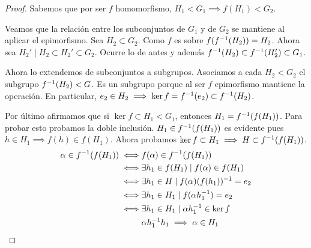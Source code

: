 \begin{proof}
	Sabemos que por ser $f$ homomorfismo, $H_1 < G_1 \implies f(H_1) < G_2$.
	
	Veamos que la relación entre los subconjuntos de $G_1$ y de $G_2$ se mantiene al aplicar el epimorfismo. Sea $H_2 \subset G_2$. Como $f$ es sobre $f(f^{-1}(H_2)) = H_2$. Ahora sea $H_2' \mid H_2 \subset H_2' \subset G_2$. Ocurre lo de antes y además $f^{-1}(H_2) \subset f^{-1}(H_2') \subset G_1$.
	
	Ahora lo extendemos de subconjuntos a subgrupos. Asociamos a cada $H_2 < G_2$ el subgrupo $f^{-1}(H_2) < G$. Es un subgrupo porque al ser $f$ epimorfismo mantiene la operación. En particular, $e_2 \in H_2 \implies \ker f = f^{-1}(e_2) \subset f^{-1}(H_2)$.
	
	Por último afirmamos que si $\ker f \subset H_1 < G_1$, entonces $H_1 = f^{-1}(f(H_1))$. Para probar esto probamos la doble inclusión. $H_1 \in f^{-1}(f(H_1))$ es evidente pues $h \in H_1 \implies f(h) \in f(H_1)$. Ahora probamos $\ker f \subset H_1 \implies H \subset f^{-1}(f(H_1))$.
	\begin{align*}
		\alpha \in f^{-1}(f(H_1)) \iff& f(\alpha) \in f^{-1}(f(H_1)) \\
		\iff& \exists h_1 \in f(H_1) \mid f(\alpha) \in f(H_1) \\
		\iff& \exists h_1 \in H \mid f(\alpha)(f(h_1))^{-1} = e_2 \\
		\iff& \exists h_1 \in H_1 \mid f(\alpha h_1^{-1}) = e_2 \\
		\iff& \exists h_1 \in H_1 \mid \alpha h_1^{-1} \in \ker f \\
		&\alpha h_1^{-1} h_1 \implies \alpha \in H_1
	\end{align*}
\end{proof}

\begin{figure}[h]
	\centering
\end{figure}

